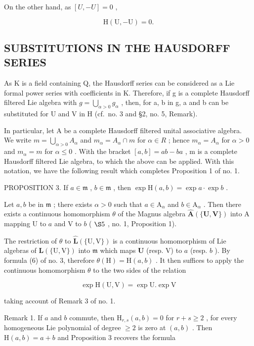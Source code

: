 On the other hand, as \([U, -U] = 0\) ,

\[
\mathrm{H} (\mathrm{U}, - \mathrm{U}) = 0.\tag{17}
\]

\subsection{SUBSTITUTIONS IN THE HAUSDORFF SERIES}

As K is a field containing Q, the Hausdorff series can be considered as a Lie formal power series with coefficients in K. Therefore, if g is a complete Hausdorff filtered Lie algebra with \(g = \bigcup_{\alpha > 0} g_{\alpha}\) , then, for a, b in g, a and b can be substituted for U and V in H (cf.~no. 3 and §2, no. 5, Remark).

In particular, let A be a complete Hausdorff filtered unital associative algebra. We write \(m = \bigcup_{\alpha > 0} A_{\alpha}\) and \(m_{\alpha} = A_{\alpha} \cap m\) for \(\alpha \in R\) ; hence \(m_{\alpha} = A_{\alpha}\) for \(\alpha > 0\) and \(m_{\alpha} = m\) for \(\alpha \leqslant 0\) . With the bracket \([a, b] = ab - ba\) , m is a complete Hausdorff filtered Lie algebra, to which the above can be applied. With this notation, we have the following result which completes Proposition 1 of no. 1.

PROPOSITION 3. If \(a \in \mathfrak{m}\) , \(b \in \mathfrak{m}\) , then \(\exp \mathrm{H}(a, b) = \exp a \cdot \exp b\) .

Let \(a, b\) be in \(\mathfrak{m}\) ; there exists \(\alpha > 0\) such that \(a \in \mathrm{A}_{\alpha}\) and \(b \in \mathrm{A}_{\alpha}\) . Then there exists a continuous homomorphism \(\theta\) of the Magnus algebra \(\hat{\mathbf{A}}(\{\mathbf{U},\mathbf{V}\})\) into A mapping U to \(a\) and V to \(b\) ( \(\S 5\) , no. 1, Proposition 1).

The restriction of \(\theta\) to \(\hat{\mathbf{L}}(\{\mathrm{U},\mathrm{V}\})\) is a continuous homomorphism of Lie algebras of \(\mathbf{L}(\{\mathrm{U},\mathrm{V}\})\) into \(\mathfrak{m}\) which maps \(\mathbf{U}\) (resp. V) to \(a\) (resp. \(b\) ). By formula (6) of no. 3, therefore \(\theta (\mathrm{H}) = \mathrm{H}(a,b)\) . It then suffices to apply the continuous homomorphism \(\theta\) to the two sides of the relation

\[
\exp \mathrm{H} (\mathrm{U}, \mathrm{V}) = \exp \mathrm{U}. \exp \mathrm{V}
\]

taking account of Remark 3 of no. 1.

Remark 1. If \(a\) and \(b\) commute, then \(\mathrm{H}_{r,s}(a,b) = 0\) for \(r + s \geqslant 2\) , for every homogeneous Lie polynomial of degree \(\geqslant 2\) is zero at \((a,b)\) . Then \(\mathrm{H}(a,b) = a + b\) and Proposition 3 recovers the formula

